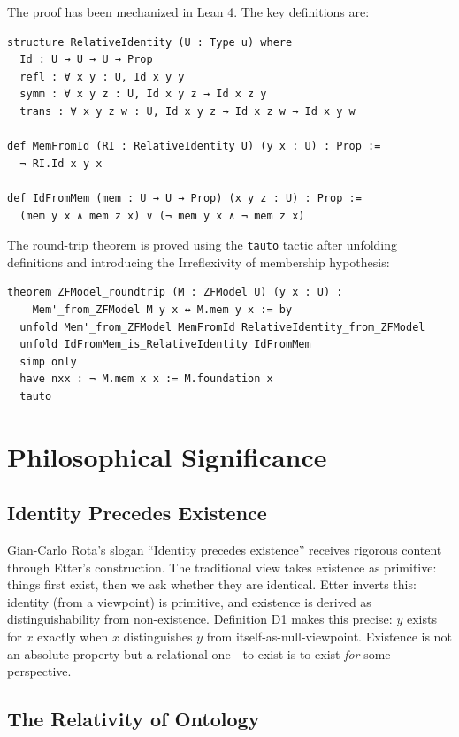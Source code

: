\documentclass{ws-rv9x6}
\theoremstyle{remark}
\begin{document}
The proof has been mechanized in Lean 4. The key definitions are:

\begin{verbatim}
structure RelativeIdentity (U : Type u) where
  Id : U → U → U → Prop
  refl : ∀ x y : U, Id x y y
  symm : ∀ x y z : U, Id x y z → Id x z y
  trans : ∀ x y z w : U, Id x y z → Id x z w → Id x y w

def MemFromId (RI : RelativeIdentity U) (y x : U) : Prop :=
  ¬ RI.Id x y x

def IdFromMem (mem : U → U → Prop) (x y z : U) : Prop :=
  (mem y x ∧ mem z x) ∨ (¬ mem y x ∧ ¬ mem z x)
\end{verbatim}

The round-trip theorem is proved using the \texttt{tauto} tactic after unfolding definitions and introducing the Irreflexivity of membership hypothesis:

\begin{verbatim}
theorem ZFModel_roundtrip (M : ZFModel U) (y x : U) :
    Mem'_from_ZFModel M y x ↔ M.mem y x := by
  unfold Mem'_from_ZFModel MemFromId RelativeIdentity_from_ZFModel
  unfold IdFromMem_is_RelativeIdentity IdFromMem
  simp only
  have nxx : ¬ M.mem x x := M.foundation x
  tauto
\end{verbatim}

\section{Philosophical Significance}

\subsection{Identity Precedes Existence}

Gian-Carlo Rota's slogan ``Identity precedes existence''\cite{rota} receives rigorous content through Etter's construction. The traditional view takes existence as primitive: things first exist, then we ask whether they are identical. Etter inverts this: identity (from a viewpoint) is primitive, and existence is derived as distinguishability from non-existence. Definition D1 makes this precise: $y$ exists for $x$ exactly when $x$ distinguishes $y$ from itself-as-null-viewpoint. Existence is not an absolute property but a relational one---to exist is to exist \emph{for} some perspective.

\subsection{The Relativity of Ontology}
\end{document}
